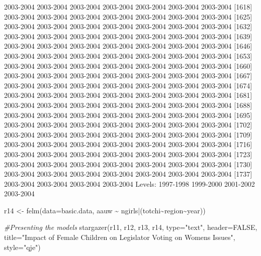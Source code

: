 \documentclass[
]{article}
\newenvironment{Shaded}{\begin{snugshade}}{\end{snugshade}}
\newcommand{\AttributeTok}[1]{\textcolor[rgb]{0.77,0.63,0.00}{#1}}
\newcommand{\CommentTok}[1]{\textcolor[rgb]{0.56,0.35,0.01}{\textit{#1}}}
\newcommand{\ConstantTok}[1]{\textcolor[rgb]{0.00,0.00,0.00}{#1}}
\newcommand{\FunctionTok}[1]{\textcolor[rgb]{0.00,0.00,0.00}{#1}}
\newcommand{\NormalTok}[1]{#1}
\newcommand{\OtherTok}[1]{\textcolor[rgb]{0.56,0.35,0.01}{#1}}
\newcommand{\SpecialCharTok}[1]{\textcolor[rgb]{0.00,0.00,0.00}{#1}}
\newcommand{\StringTok}[1]{\textcolor[rgb]{0.31,0.60,0.02}{#1}}
\begin{document}
2003-2004 2003-2004 2003-2004 2003-2004 2003-2004 2003-2004 2003-2004
{[}1618{]} 2003-2004 2003-2004 2003-2004 2003-2004 2003-2004 2003-2004
2003-2004 {[}1625{]} 2003-2004 2003-2004 2003-2004 2003-2004 2003-2004
2003-2004 2003-2004 {[}1632{]} 2003-2004 2003-2004 2003-2004 2003-2004
2003-2004 2003-2004 2003-2004 {[}1639{]} 2003-2004 2003-2004 2003-2004
2003-2004 2003-2004 2003-2004 2003-2004 {[}1646{]} 2003-2004 2003-2004
2003-2004 2003-2004 2003-2004 2003-2004 2003-2004 {[}1653{]} 2003-2004
2003-2004 2003-2004 2003-2004 2003-2004 2003-2004 2003-2004 {[}1660{]}
2003-2004 2003-2004 2003-2004 2003-2004 2003-2004 2003-2004 2003-2004
{[}1667{]} 2003-2004 2003-2004 2003-2004 2003-2004 2003-2004 2003-2004
2003-2004 {[}1674{]} 2003-2004 2003-2004 2003-2004 2003-2004 2003-2004
2003-2004 2003-2004 {[}1681{]} 2003-2004 2003-2004 2003-2004 2003-2004
2003-2004 2003-2004 2003-2004 {[}1688{]} 2003-2004 2003-2004 2003-2004
2003-2004 2003-2004 2003-2004 2003-2004 {[}1695{]} 2003-2004 2003-2004
2003-2004 2003-2004 2003-2004 2003-2004 2003-2004 {[}1702{]} 2003-2004
2003-2004 2003-2004 2003-2004 2003-2004 2003-2004 2003-2004 {[}1709{]}
2003-2004 2003-2004 2003-2004 2003-2004 2003-2004 2003-2004 2003-2004
{[}1716{]} 2003-2004 2003-2004 2003-2004 2003-2004 2003-2004 2003-2004
2003-2004 {[}1723{]} 2003-2004 2003-2004 2003-2004 2003-2004 2003-2004
2003-2004 2003-2004 {[}1730{]} 2003-2004 2003-2004 2003-2004 2003-2004
2003-2004 2003-2004 2003-2004 {[}1737{]} 2003-2004 2003-2004 2003-2004
2003-2004 Levels: 1997-1998 1999-2000 2001-2002 2003-2004

\begin{Shaded}
\begin{Highlighting}[]
\NormalTok{r14 }\OtherTok{\textless{}{-}} \FunctionTok{felm}\NormalTok{(}\AttributeTok{data=}\NormalTok{basic.data, aauw }\SpecialCharTok{\textasciitilde{}}\NormalTok{ ngirls}\SpecialCharTok{|}\NormalTok{(totchi}\SpecialCharTok{\textasciitilde{}}\NormalTok{region}\SpecialCharTok{\textasciitilde{}}\NormalTok{year))}


\CommentTok{\#Presenting the models}
\FunctionTok{stargazer}\NormalTok{(r11, r12, r13, r14, }\AttributeTok{type=}\StringTok{"text"}\NormalTok{, }\AttributeTok{header=}\ConstantTok{FALSE}\NormalTok{, }\AttributeTok{title=}\StringTok{"Impact of Female Children on Legislator Voting on Women\textquotesingle{}s Issues"}\NormalTok{, }
                     \AttributeTok{style=}\StringTok{"qje"}\NormalTok{)}
\end{Highlighting}
\end{Shaded}
\end{document}
